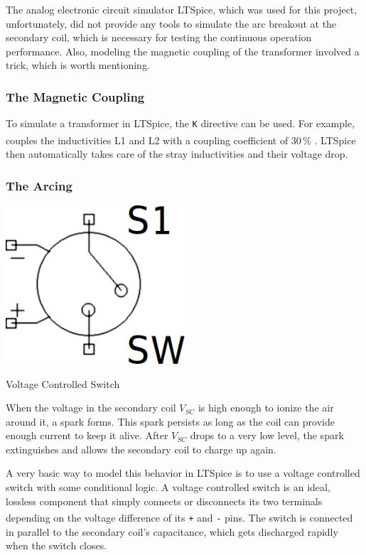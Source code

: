 The analog electronic circuit simulator LTSpice, which was used for this project, unfortunately, did not provide any tools to simulate the arc breakout at the secondary coil, which is necessary for testing the continuous operation performance. Also, modeling the magnetic coupling of the transformer involved a trick, which is worth mentioning.

\subsubsection{The Magnetic Coupling}

To simulate a transformer in LTSpice, the \texttt{K} directive can be used. For example,  couples the inductivities L1 and L2 with a coupling coefficient of 30\,\% \textsuperscript{}. LTSpice then automatically takes care of the stray inductivities and their voltage drop.

\newpage
\subsubsection{The Arcing}

\begin{marginfigure}[5mm]
    \centering
    \includegraphics[width=0.5\textwidth]{simon/resources/ltspice_sw.png}
    \caption{Voltage Controlled Switch}
    \label{fig:ltspice_sw}
\end{marginfigure}

When the voltage in the secondary coil \(V_{SC}\) is high enough to ionize the air around it, a spark forms. This spark persists as long as the coil can provide enough current to keep it alive. After \(V_{SC}\) drops to a very low level, the spark extinguishes and allows the secondary coil to charge up again.

A very basic way to model this behavior in LTSpice is to use a voltage controlled switch with some conditional logic. A voltage controlled switch is an ideal, lossless component that simply connects or disconnects its two terminals depending on the voltage difference of its \texttt{+} and \texttt{-} pins\textsuperscript{}. The switch is connected in parallel to the secondary coil's capacitance, which gets discharged rapidly when the switch closes.

